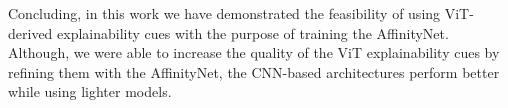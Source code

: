 Concluding, in this work we have demonstrated the feasibility of using ViT-derived explainability cues with the purpose of training the AffinityNet. Although, we were able to increase the quality of the ViT explainability cues by refining them with the AffinityNet, the CNN-based architectures perform better while using lighter models.

